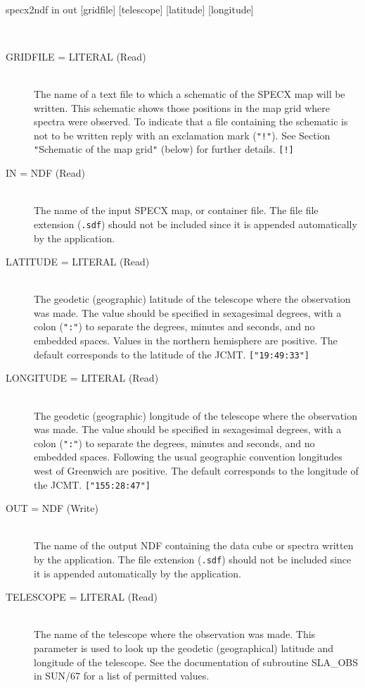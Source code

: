 \documentclass[twoside,11pt]{article}
\newcommand{\htmlref}[2]{#1}
\newcommand{\xref}[3]{#1}
\newcommand{\sstusage}[1]{\item[Usage:] \mbox{}
\\[1.3ex]{\raggedright \ssttt #1}}
\newcommand{\sstparameters}[1]{
   \goodbreak 
   \item[Parameters:] \mbox{} \\
   \vspace{-3.5ex}
   \begin{description}
      #1
   \end{description}
}
\newcommand{\sstsubsection}[1]{ \item[{#1}] \mbox{} \\}
\newcommand{\sstusage}[1]{\item[\htmlref{Usage:}{app_usage}]
      \begin{description}
         {\ssttt #1}
      \end{description}
      \\
   }
\newcommand{\sstparameters}[1]{
      \item[\xref{Parameters:}{sun95}{se_param}] \\
      \begin{description}
         #1
      \end{description}
   }
\newcommand{\sstsubsection}[1]{\item[{#1}]}
\begin{document}
{{   }
   \sstusage{
      specx2ndf in out [gridfile] [telescope] [latitude] [longitude]
   }
   \sstparameters{
      \sstsubsection{
         GRIDFILE  =  LITERAL (Read)
      }{
         The name of a text file to which a schematic of the SPECX map
         will be written.  This schematic shows those positions in the
         map grid where spectra were observed.  To indicate that a file
         containing the schematic is not to be written reply with an
         exclamation mark (\texttt{"!"}).  See Section 
         \htmlref{\texttt{"}Schematic of the map grid\texttt{"}}{SCHEMATICMAP}
         (below) for further details.  \texttt{[!]}
      }
      \sstsubsection{
         IN  =  NDF (Read)
      }{
         The name of the input SPECX map, or container file.  The file
         file extension (\texttt{.sdf}) should not be included since it
         is appended automatically by the application.
      }
      \sstsubsection{
         LATITUDE  =  LITERAL (Read)
      }{
         The geodetic (geographic) latitude of the telescope where the
         observation was made.  The value should be specified in
         sexagesimal degrees, with a colon (\texttt{":"}) to separate the
         degrees, minutes and seconds, and no embedded spaces.  Values in
         the northern hemisphere are positive.  The default corresponds
         to the latitude of the JCMT.  \texttt{["19:49:33"]}
      }
      \sstsubsection{
         LONGITUDE  =  LITERAL (Read)
      }{
         The geodetic (geographic) longitude of the telescope where the
         observation was made.  The value should be specified in
         sexagesimal degrees, with a colon (\texttt{":"}) to separate the
         degrees, minutes and seconds, and no embedded spaces.  Following
         the usual geographic convention longitudes west of Greenwich are
         positive.  The default corresponds to the longitude of the
         JCMT.  \texttt{["155:28:47"]}
      }
      \sstsubsection{
         OUT  =  NDF (Write)
      }{
         The name of the output NDF containing the data cube or spectra written
         by the application.  The file extension (\texttt{.sdf}) should not be
         included since it is appended automatically by the application.
      }
      \sstsubsection{
         TELESCOPE  =  LITERAL (Read)
      }{
         The name of the telescope where the observation was made.
         This parameter is used to look up the geodetic (geographical)
         latitude and longitude of the telescope.  See the documentation
         of subroutine SLA\_OBS in 
         \xref{SUN/67}{sun67}{} for a list of permitted values.
}}}
\end{document}
